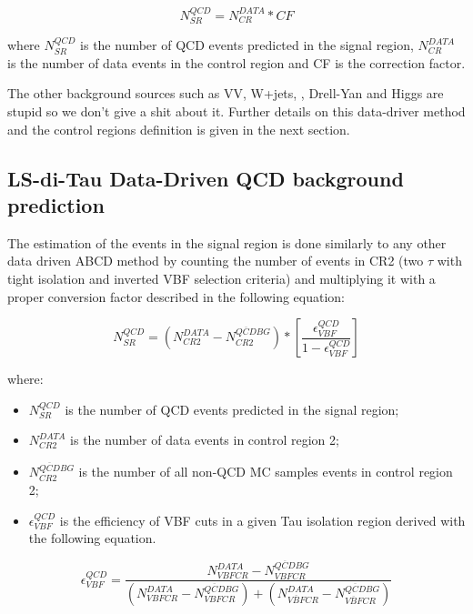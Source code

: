 \begin{equation}
N^{QCD}_{SR} =  N^{DATA}_{CR} * CF
\label{eq:qcdbgpred_simple}
\end{equation} 

where $N^{QCD}_{SR}$ is the number of QCD events predicted in the signal region, $N^{DATA}_{CR}$ is the number of data events in the control region and CF is the correction factor. 

The other background sources such as VV, W+jets, \ttbar, Drell-Yan and Higgs are stupid so we don't give a shit about it.   
Further details on this data-driver method and the control regions definition is given in the next section.
\subsection {LS-di-Tau Data-Driven QCD background prediction} \label{sec:bgestimation}

The estimation of the events in the signal region is done similarly to any other data driven ABCD method by counting the number of events in CR2 (two $\tau$ with tight isolation and inverted VBF selection criteria) and multiplying it with a proper conversion factor described in the following equation:

\begin{equation}
N^{QCD}_{SR} = \left( N^{DATA}_{CR2} - N^{\overline{QCD} BG}_{CR2} \right) * \left[ \frac{\epsilon^{QCD}_{VBF}}{1 - \epsilon^{QCD}_{VBF}} \right]
\label{eq:qcdbgpred}
\end{equation}

where:

\begin{itemize}
	\item $N^{QCD}_{SR}$ is the number of QCD events predicted in the signal region;
	\item  $N^{DATA}_{CR2}$ is the number of data events in control region 2;
	\item $N^{\overline{QCD} BG}_{CR2}$ is the number of all non-QCD MC samples events in control region 2;
	\item $\epsilon^{QCD}_{VBF}$ is the efficiency of VBF cuts in a given Tau isolation region derived with the following equation.
\end{itemize}

\begin{equation}
\epsilon^{QCD}_{VBF} = \frac {N^{DATA}_{VBF CR} - N^{\overline{QCD} BG}_{VBFCR}}{\left( N^{DATA}_{VBFCR} - N^{\overline{QCD} BG}_{VBFCR} \right) + \left( N^{DATA}_{\overline{VBF}CR} - N^{\overline{QCD} BG}_{\overline{VBF}CR} \right) }
\label{eq:vbfeff}
\end{equation}

